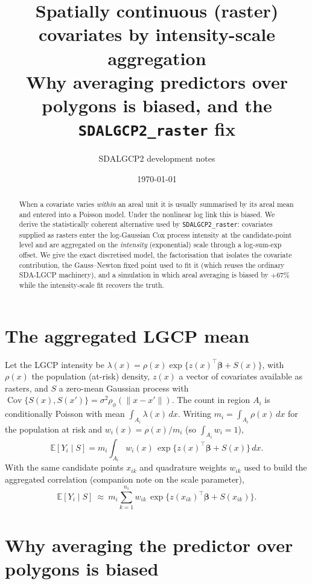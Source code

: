 \documentclass[11pt]{article}
\title{\textbf{Spatially continuous (raster) covariates by intensity-scale
aggregation}\\[4pt]
\large Why averaging predictors over polygons is biased, and the
\texttt{SDALGCP2\_raster} fix}
\author{SDALGCP2 development notes}
\date{\today}
\newcommand{\bet}{\bm{\beta}}
\newcommand{\Ai}{A_i}
\newcommand{\E}{\mathbb{E}}
\newcommand{\Cov}{\operatorname{Cov}}
\begin{document}
\maketitle

\begin{abstract}
When a covariate varies \emph{within} an areal unit it is usually summarised by its
areal mean and entered into a Poisson model. Under the nonlinear log link this is
biased. We derive the statistically coherent alternative used by
\texttt{SDALGCP2\_raster}: covariates supplied as rasters enter the log-Gaussian
Cox process intensity at the candidate-point level and are aggregated on the
\emph{intensity} (exponential) scale through a log-sum-exp offset. We give the
exact discretised model, the factorisation that isolates the covariate
contribution, the Gauss--Newton fixed point used to fit it (which reuses the
ordinary SDA-LGCP machinery), and a simulation in which areal averaging is biased
by $+67\%$ while the intensity-scale fit recovers the truth.
\end{abstract}

\section{The aggregated LGCP mean}

Let the LGCP intensity be $\lambda(x)=\rho(x)\exp\{z(x)^\top\bet+S(x)\}$, with
$\rho(x)$ the population (at-risk) density, $z(x)$ a vector of covariates available
as rasters, and $S$ a zero-mean Gaussian process with
$\Cov\{S(x),S(x')\}=\sigma^2\rho_\phi(\|x-x'\|)$. The count in region $\Ai$ is
conditionally Poisson with mean $\int_{\Ai}\lambda(x)\,dx$. Writing
$m_i=\int_{\Ai}\rho(x)\,dx$ for the population at risk and
$w_i(x)=\rho(x)/m_i$ (so $\int_{\Ai}w_i=1$),
\begin{equation}
\E[Y_i\mid S]=m_i\int_{\Ai} w_i(x)\,\exp\!\big\{z(x)^\top\bet+S(x)\big\}\,dx .
\label{eq:mean}
\end{equation}
With the same candidate points $x_{ik}$ and quadrature weights $w_{ik}$ used to
build the aggregated correlation (companion note on the scale parameter),
\begin{equation}
\E[Y_i\mid S]\ \approx\ m_i\sum_{k=1}^{n_i} w_{ik}\,
   \exp\!\big\{z(x_{ik})^\top\bet + S(x_{ik})\big\}.
\label{eq:disc}
\end{equation}

\section{Why averaging the predictor over polygons is biased}
\end{document}
